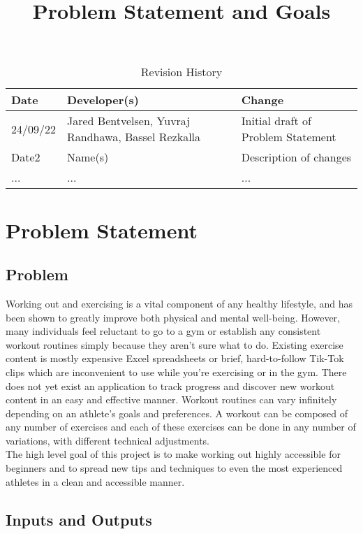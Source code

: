 \documentclass{article}
\title{Problem Statement and Goals\\\progname}
\author{\authname}
\date{}
\begin{document}
\maketitle

\begin{table}[hp]
\caption{Revision History} \label{TblRevisionHistory}
\begin{tabularx}{\textwidth}{llX}
\toprule
\textbf{Date} & \textbf{Developer(s)} & \textbf{Change}\\
\midrule
24/09/22 & Jared Bentvelsen, Yuvraj Randhawa, Bassel Rezkalla & Initial draft of Problem Statement\\
Date2 & Name(s) & Description of changes\\
... & ... & ...\\
\bottomrule
\end{tabularx}
\end{table}

\section{Problem Statement}

\subsection{Problem}

Working out and exercising is a vital component of any healthy lifestyle, and has been shown to greatly improve both physical and mental well-being. However,
many individuals feel reluctant to go to a gym or establish any consistent workout routines simply because they aren't sure what to do. 
Existing exercise content is mostly expensive Excel spreadsheets or brief, hard-to-follow Tik-Tok clips which are inconvenient to use while you're exercising or in the gym.
There does not yet exist an application to track progress and discover new workout content in an easy and effective manner.
Workout routines can vary infinitely depending on an athlete's goals and preferences. A workout can be composed of any number of exercises
and each of these exercises can be done in any number of variations, with different technical adjustments. 
\\
The high level goal of this project is to
make working out highly accessible for beginners and to spread new tips and techniques to even the most experienced athletes in a clean and accessible manner.

\subsection{Inputs and Outputs}
\end{document}
